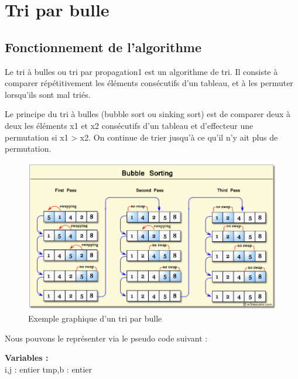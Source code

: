 \chapter{Tri par bulle}
\section{Fonctionnement de l'algorithme}
Le tri à bulles ou tri par propagation1 est un algorithme de tri. Il consiste à comparer répétitivement les éléments consécutifs d'un tableau, et à les permuter lorsqu'ils sont mal triés.
\par
Le principe du tri à bulles (bubble sort ou sinking sort) est de comparer deux à deux les éléments x1 et x2 consécutifs d'un tableau et d'effecteur une permutation si x1 > x2. On continue de trier jusqu'à ce qu'il n'y ait plus de permutation.
\begin{figure}[H]
    \centering
        \includegraphics[scale=0.5]{ressources/bubble-sort.png}
        \caption{Exemple graphique d’un tri par bulle}
    \label{fig:fusion}
\end{figure}
\par
Nous pouvons le représenter via le pseudo code suivant :
\par
\begin{function}[H]
    \textbf{Variables :}\\
    i,j : entier\;
    tmp,b : entier\;
    
    
    \caption{Bulle(Entrée: tab: tableau d'entier; )}
\end{function}
